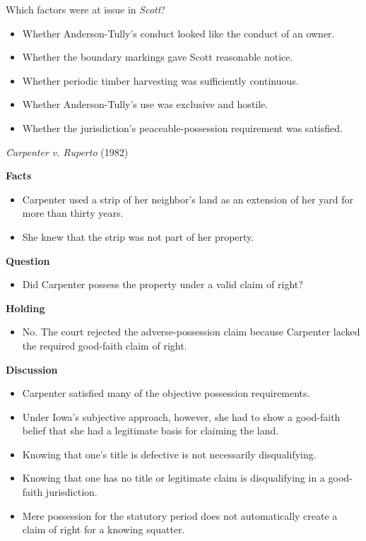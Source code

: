 \documentclass[11pt]{tex/lawoutline}
\begin{document}
\question
{Which factors were at issue in \textit{Scott}?}
{
\begin{itemize}
    \item Whether Anderson-Tully's conduct looked like the conduct of an owner.
    \item Whether the boundary markings gave Scott reasonable notice.
    \item Whether periodic timber harvesting was sufficiently continuous.
    \item Whether Anderson-Tully's use was exclusive and hostile.
    \item Whether the jurisdiction's peaceable-possession requirement was satisfied.
\end{itemize}
}

\casebox
{\textit{Carpenter v. Ruperto} (1982)}
{}
{
\textbf{Facts}
\begin{itemize}
    \item Carpenter used a strip of her neighbor's land as an extension of her yard for more than thirty years.
    \item She knew that the strip was not part of her property.
\end{itemize}

\textbf{Question}
\begin{itemize}
    \item Did Carpenter possess the property under a valid claim of right?
\end{itemize}

\textbf{Holding}
\begin{itemize}
    \item No. The court rejected the adverse-possession claim because Carpenter lacked the required good-faith claim of right.
\end{itemize}

\textbf{Discussion}
\begin{itemize}
    \item Carpenter satisfied many of the objective possession requirements.
    \item Under Iowa's subjective approach, however, she had to show a good-faith belief that she had a legitimate basis for claiming the land.
    \item Knowing that one's title is defective is not necessarily disqualifying.
    \item Knowing that one has no title or legitimate claim is disqualifying in a good-faith jurisdiction.
    \item Mere possession for the statutory period does not automatically create a claim of right for a knowing squatter.
\end{itemize}
}
\end{document}
